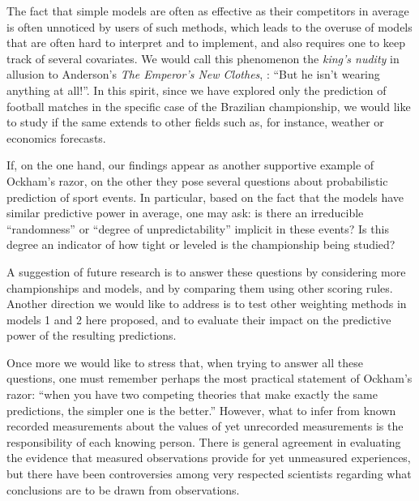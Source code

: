 \documentclass[journal,article,accept,moreauthors,pdftex,12pt,a4paper]{mdpi}
\begin{document}
{\color{blue}The fact that simple models are often as effective as their competitors in average is often unnoticed by users of such methods, which leads to the overuse of models that are often
	hard to interpret and to implement, and also requires one to keep track of several covariates. We would call this phenomenon the {\it king's nudity} in allusion to Anderson's {\it The Emperor's New Clothes}, \cite{emperor}: ``But he isn't wearing anything at all!''. In this spirit, since we have explored only the prediction of football matches in the specific case of the Brazilian championship, we would like to study if the same extends to other fields such as, for instance, weather or economics forecasts.}
		
		If, on the one hand, our findings appear as another supportive example of Ockham's razor, on the other they pose several questions about probabilistic prediction of sport events.
		In particular, based on the fact that the models have similar predictive power in average, one may ask: is there an irreducible ``randomness'' or ``degree of unpredictability'' implicit in these events?
		Is this degree an indicator of how tight or leveled is the championship being studied?
		
		A suggestion of future research is to answer these questions by considering more championships and models, and by comparing them using other scoring rules.
		Another direction we would like to address is to test other weighting methods in models 1 and 2 here
		proposed, and to evaluate their impact on the predictive power of the resulting predictions.
		
		Once more we would like to stress that, when trying to answer all these questions, one must remember perhaps the most practical statement of Ockham's razor: ``when you have two competing theories that make exactly the same predictions, the simpler one is the better.''
		However, what to infer from known recorded measurements about the values of yet unrecorded measurements is the responsibility of each knowing person.
		There is general agreement in evaluating the evidence that measured observations provide for yet unmeasured experiences, but there have been controversies among very respected scientists regarding what conclusions are to be drawn from observations.
		
		
		
		
\end{document}

